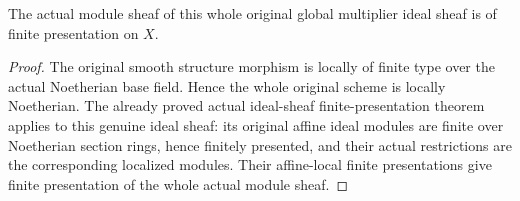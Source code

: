 \begin{theorem}\label{thm:sc0-original-global-multiplier-module-finite-presentation}
\leanok
{}
The actual module sheaf of this whole original global multiplier
ideal sheaf is of finite presentation on $X$.
\end{theorem}
\begin{proof}
The original smooth structure morphism is locally of finite type
over the actual Noetherian base field. Hence the whole original
scheme is locally Noetherian. The already proved actual
ideal-sheaf finite-presentation theorem applies to this genuine
ideal sheaf: its original affine ideal modules are finite over
Noetherian section rings, hence finitely presented, and their
actual restrictions are the corresponding localized modules.
Their affine-local finite presentations give finite presentation
of the whole actual module sheaf.
\end{proof}
